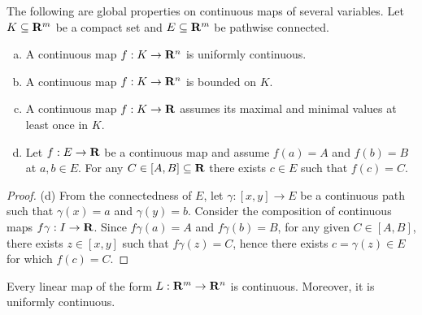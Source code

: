 \begin{proposition}
    \label{prop:global-properties-continuous-on-compact}
    The following are global properties on continuous maps of several
    variables. Let \(K \subseteq \mathbf{R}^m\) be a compact set and \(E \subseteq \mathbf{R}^m\)
    be pathwise connected.
    \begin{enumerate}[(a)]
        \item A continuous map \(f: K \to \mathbf{R}^n\) is uniformly continuous.
        \item A continuous map \(f: K \to \mathbf{R}^n\) is bounded on \(K\).
        \item A continuous map \(f: K \to \mathbf{R}\) assumes its maximal and minimal
              values at least once in \(K\).
        \item Let \(f: E \to \mathbf{R}\) be a continuous map and assume \(f(a) = A\) and
              \(f(b) = B\) at \(a, b \in E\). For any \(C \in [A, B] \subseteq \mathbf{R}\)
              there exists \(c \in E\) such that \(f(c) = C\).
    \end{enumerate}
\end{proposition}

\begin{proof}
    (d) From the connectedness of \(E\), let \(\gamma: [x, y] \to E\) be a
    continuous path such that \(\gamma(x) = a\) and \(\gamma(y) = b\). Consider
    the composition of continuous maps \(f  \gamma: I \to \mathbf{R}\). Since \(f
    \gamma(a) = A\) and \(f  \gamma(b) = B\), for any given \(C \in [A,
        B]\), there exists \(z \in [x, y]\) such that \(f  \gamma(z) = C\), hence
    there exists \(c = \gamma(z) \in E\) for which \(f(c) = C\).
\end{proof}

\begin{proposition}\label{prop: linear-continuous}
    Every linear map of the form \(L: \mathbf{R}^m \to \mathbf{R}^n\) is continuous. Moreover, it
    is uniformly continuous.
\end{proposition}

